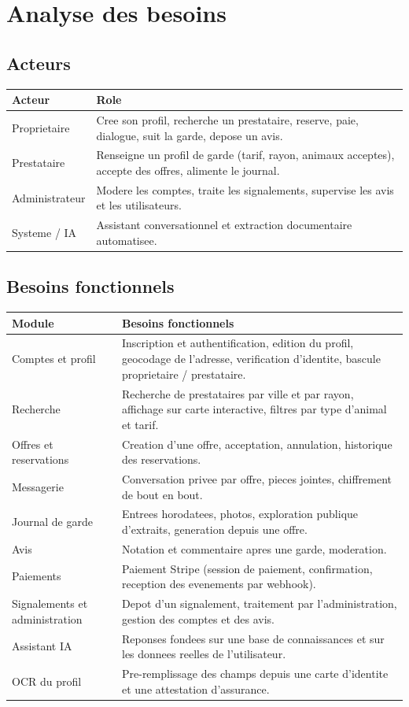 \documentclass[11pt,a4paper]{article}
\begin{document}
\section{Analyse des besoins}

\subsection{Acteurs}
\begin{tabularx}{\linewidth}{@{}lX@{}}
\toprule
\textbf{Acteur} & \textbf{Role} \\
\midrule
Proprietaire & Cree son profil, recherche un prestataire, reserve, paie, dialogue, suit la garde, depose un avis. \\
Prestataire & Renseigne un profil de garde (tarif, rayon, animaux acceptes), accepte des offres, alimente le journal. \\
Administrateur & Modere les comptes, traite les signalements, supervise les avis et les utilisateurs. \\
Systeme / IA & Assistant conversationnel et extraction documentaire automatisee. \\
\bottomrule
\end{tabularx}

\subsection{Besoins fonctionnels}
\begin{tabularx}{\linewidth}{@{}lX@{}}
\toprule
\textbf{Module} & \textbf{Besoins fonctionnels} \\
\midrule
Comptes et profil & Inscription et authentification, edition du profil, geocodage de l'adresse, verification d'identite, bascule proprietaire / prestataire. \\
Recherche & Recherche de prestataires par ville et par rayon, affichage sur carte interactive, filtres par type d'animal et tarif. \\
Offres et reservations & Creation d'une offre, acceptation, annulation, historique des reservations. \\
Messagerie & Conversation privee par offre, pieces jointes, chiffrement de bout en bout. \\
Journal de garde & Entrees horodatees, photos, exploration publique d'extraits, generation depuis une offre. \\
Avis & Notation et commentaire apres une garde, moderation. \\
Paiements & Paiement Stripe (session de paiement, confirmation, reception des evenements par webhook). \\
Signalements et administration & Depot d'un signalement, traitement par l'administration, gestion des comptes et des avis. \\
Assistant IA & Reponses fondees sur une base de connaissances et sur les donnees reelles de l'utilisateur. \\
OCR du profil & Pre-remplissage des champs depuis une carte d'identite et une attestation d'assurance. \\
\bottomrule
\end{tabularx}
\end{document}
